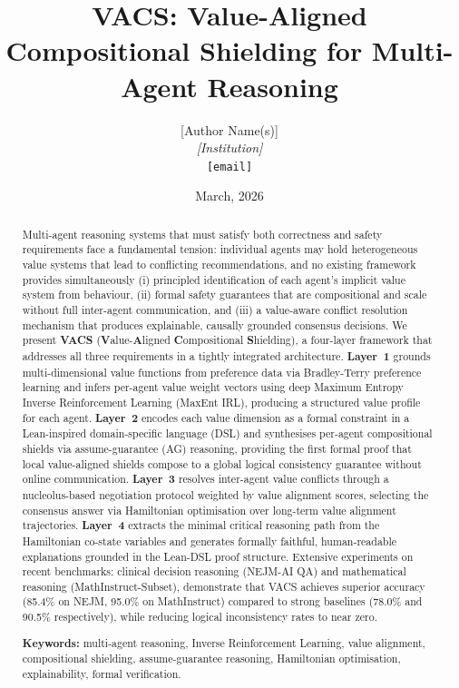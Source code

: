 \documentclass[12pt,a4paper]{article}
\title{\textbf{VACS: Value-Aligned Compositional Shielding for
Multi-Agent Reasoning}}
\author{
  [Author Name(s)]\\
  \textit{[Institution]}\\
  \texttt{[email]}
}
\date{March, 2026}
\begin{document}
\maketitle

\begin{abstract}
Multi-agent reasoning systems that must satisfy both correctness and safety requirements
face a fundamental tension: individual agents may hold heterogeneous value systems that
lead to conflicting recommendations, and no existing framework provides simultaneously
(i) principled identification of each agent's implicit value system from behaviour,
(ii) formal safety guarantees that are compositional and scale without full inter-agent
communication, and (iii) a value-aware conflict resolution mechanism that produces
explainable, causally grounded consensus decisions. We present \textbf{VACS}
(\textbf{V}alue-\textbf{A}ligned \textbf{C}ompositional \textbf{S}hielding), a
four-layer framework that addresses all three requirements in a tightly integrated
architecture. \textbf{Layer~1} grounds multi-dimensional value functions from
preference data via Bradley-Terry preference learning and infers per-agent value weight
vectors using deep Maximum Entropy Inverse Reinforcement Learning (MaxEnt IRL),
producing a structured value profile for each agent. \textbf{Layer~2} encodes each
value dimension as a formal constraint in a Lean-inspired domain-specific language
(DSL) and synthesises per-agent compositional shields via assume-guarantee (AG)
reasoning, providing the first formal proof that local value-aligned shields compose
to a global logical consistency guarantee without online communication. \textbf{Layer~3}
resolves inter-agent value conflicts through a nucleolus-based negotiation protocol
weighted by value alignment scores, selecting the consensus answer via Hamiltonian
optimisation over long-term value alignment trajectories. \textbf{Layer~4} extracts
the minimal critical reasoning path from the Hamiltonian co-state variables and
generates formally faithful, human-readable explanations grounded in the Lean-DSL
proof structure. Extensive experiments on recent benchmarks: clinical decision reasoning (NEJM-AI QA) and mathematical reasoning (MathInstruct-Subset), demonstrate that VACS achieves superior accuracy (85.4\% on NEJM, 95.0\% on MathInstruct) compared to strong baselines (78.0\% and 90.5\% respectively), while reducing logical inconsistency rates to near zero.

\vspace{6pt}
\noindent\textbf{Keywords:} multi-agent reasoning, Inverse Reinforcement Learning,
value alignment, compositional shielding, assume-guarantee reasoning, Hamiltonian
optimisation, explainability, formal verification.
\end{abstract}
\end{document}
